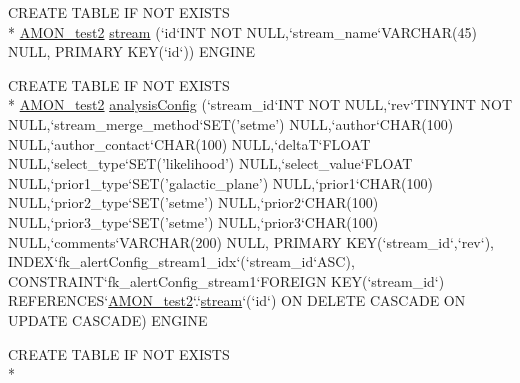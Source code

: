 \begin{DoxyCompactItemize}
\item 
C\-R\-E\-A\-T\-E T\-A\-B\-L\-E I\-F N\-O\-T E\-X\-I\-S\-T\-S \\*
\hyperlink{db__mc__build_8sql_a19c21c59303d8b6591b92240ff7de1d5}{A\-M\-O\-N\-\_\-test2} \hyperlink{db__mc__build_8sql_a67b7e9fc922cbf49b5ae3124240f4188}{stream} (`id`I\-N\-T N\-O\-T N\-U\-L\-L,`stream\-\_\-name`V\-A\-R\-C\-H\-A\-R(45) N\-U\-L\-L, P\-R\-I\-M\-A\-R\-Y K\-E\-Y(`id`)) E\-N\-G\-I\-N\-E
\item 
C\-R\-E\-A\-T\-E T\-A\-B\-L\-E I\-F N\-O\-T E\-X\-I\-S\-T\-S \\*
\hyperlink{db__mc__build_8sql_a19c21c59303d8b6591b92240ff7de1d5}{A\-M\-O\-N\-\_\-test2} \hyperlink{db__mc__build_8sql_a4a9f4a95bbb46957f7f01b91207e74ae}{analysis\-Config} (`stream\-\_\-id`I\-N\-T N\-O\-T N\-U\-L\-L,`rev`T\-I\-N\-Y\-I\-N\-T N\-O\-T N\-U\-L\-L,`stream\-\_\-merge\-\_\-method`S\-E\-T('setme') N\-U\-L\-L,`author`C\-H\-A\-R(100) N\-U\-L\-L,`author\-\_\-contact`C\-H\-A\-R(100) N\-U\-L\-L,`delta\-T`F\-L\-O\-A\-T N\-U\-L\-L,`select\-\_\-type`S\-E\-T('likelihood') N\-U\-L\-L,`select\-\_\-value`F\-L\-O\-A\-T N\-U\-L\-L,`prior1\-\_\-type`S\-E\-T('galactic\-\_\-plane') N\-U\-L\-L,`prior1`C\-H\-A\-R(100) N\-U\-L\-L,`prior2\-\_\-type`S\-E\-T('setme') N\-U\-L\-L,`prior2`C\-H\-A\-R(100) N\-U\-L\-L,`prior3\-\_\-type`S\-E\-T('setme') N\-U\-L\-L,`prior3`C\-H\-A\-R(100) N\-U\-L\-L,`comments`V\-A\-R\-C\-H\-A\-R(200) N\-U\-L\-L, P\-R\-I\-M\-A\-R\-Y K\-E\-Y(`stream\-\_\-id`,`rev`), I\-N\-D\-E\-X`fk\-\_\-alert\-Config\-\_\-stream1\-\_\-idx`(`stream\-\_\-id`A\-S\-C), C\-O\-N\-S\-T\-R\-A\-I\-N\-T`fk\-\_\-alert\-Config\-\_\-stream1`F\-O\-R\-E\-I\-G\-N K\-E\-Y(`stream\-\_\-id`) R\-E\-F\-E\-R\-E\-N\-C\-E\-S`\hyperlink{db__mc__build_8sql_a19c21c59303d8b6591b92240ff7de1d5}{A\-M\-O\-N\-\_\-test2}`.`\hyperlink{db__mc__build_8sql_a67b7e9fc922cbf49b5ae3124240f4188}{stream}`(`id`) O\-N D\-E\-L\-E\-T\-E C\-A\-S\-C\-A\-D\-E O\-N U\-P\-D\-A\-T\-E C\-A\-S\-C\-A\-D\-E) E\-N\-G\-I\-N\-E
\item 
C\-R\-E\-A\-T\-E T\-A\-B\-L\-E I\-F N\-O\-T E\-X\-I\-S\-T\-S \\*

\end{DoxyCompactItemize}
